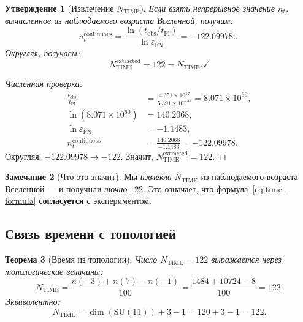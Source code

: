 \documentclass[11pt,a4paper]{article}
\newcommand{\SU}{\mathrm{SU}}
\newcommand{\epsFN}{\varepsilon_{\text{FN}}}
\newtheorem{theorem}{Теорема}[section]
\newtheorem{proposition}[theorem]{Утверждение}
\theoremstyle{definition}
\newtheorem{remark}[theorem]{Замечание}
\begin{document}
\begin{proposition}[Извлечение $N_{\text{TIME}}$]
\label{prop:ntime-extraction}
Если взять \emph{непрерывное} значение $n_t$, вычисленное 
из наблюдаемого возраста Вселенной, получим:
\begin{equation}
    n_t^{\text{continuous}} 
    = \frac{\ln(t_{\text{obs}}/t_{\text{Pl}})}{\ln \epsFN}
    = -122.09978\ldots
\end{equation}
Округляя, получаем:
\begin{equation}
    N_{\text{TIME}}^{\text{extracted}} = 122 = N_{\text{TIME}}. \checkmark
\end{equation}
\end{proposition}

\begin{proof}[Численная проверка]
\begin{align}
    \frac{t_{\text{obs}}}{t_{\text{Pl}}} 
    &= \frac{4.351 \times 10^{17}}{5.391 \times 10^{-44}} 
    = 8.071 \times 10^{60}, \\
    \ln(8.071 \times 10^{60}) &= 140.2068, \\
    \ln \epsFN &= -1.1483, \\
    n_t^{\text{continuous}} &= \frac{140.2068}{-1.1483} 
    = -122.09978.
\end{align}
Округляя: $-122.09978 \to -122$. Значит, 
$N_{\text{TIME}}^{\text{extracted}} = 122$. \checkmark
\end{proof}

\begin{remark}[Что это значит]
\label{rem:extraction-meaning}
Мы \emph{извлекли} $N_{\text{TIME}}$ из наблюдаемого возраста 
Вселенной — и получили \emph{точно} $122$. Это означает, что 
формула~\eqref{eq:time-formula} \textbf{согласуется} с 
экспериментом.
\end{remark}

\subsection{Связь времени с топологией}
\label{subsec:time-topology}

\begin{theorem}[Время из топологии]
\label{thm:time-from-topology}
Число $N_{\text{TIME}} = 122$ выражается через топологические 
величины:
\begin{equation}
    \boxed{
    N_{\text{TIME}} = \frac{n(-3) + n(7) - n(-1)}{100}
    = \frac{1484 + 10724 - 8}{100} = 122.
    }
    \label{eq:ntime-topology-1}
\end{equation}
Эквивалентно:
\begin{equation}
    N_{\text{TIME}} = \dim(\SU(11)) + 3 - 1 = 120 + 3 - 1 = 122.
\end{equation}
\end{theorem}
\end{document}
